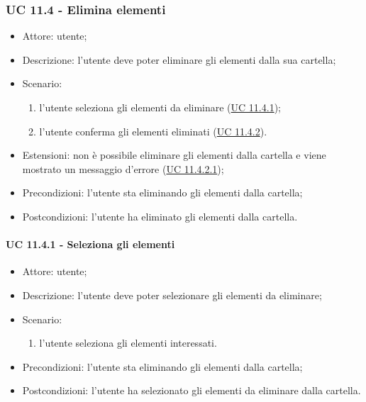     \subsubsection{UC 11.4 - Elimina elementi} \label{sec: UC 11.4}
    \begin{itemize}
        \item Attore: utente;
        \item Descrizione: l'utente deve poter eliminare gli elementi dalla sua cartella;
        \item Scenario:
        \begin{enumerate}
        \item l'utente seleziona gli elementi da eliminare (\hyperref[sec: UC 11.4.1]{UC 11.4.1});
        \item l'utente conferma gli elementi eliminati (\hyperref[sec: UC 11.4.2]{UC 11.4.2}).
        \end{enumerate}
        \item Estensioni: non è possibile eliminare gli elementi dalla cartella e viene mostrato un messaggio d'errore (\hyperref[sec: UC 11.4.2.1]{UC 11.4.2.1});
        \item Precondizioni: l'utente sta eliminando gli elementi dalla cartella;
        \item Postcondizioni: l'utente ha eliminato gli elementi dalla cartella.
    \end{itemize}
    \paragraph{UC 11.4.1 - Seleziona gli elementi} \label{sec: UC 11.4.1}
        \begin{itemize}
            \item Attore: utente;
            \item Descrizione: l'utente deve poter selezionare gli elementi da eliminare;
            \item Scenario:
            \begin{enumerate}
                \item l'utente seleziona gli elementi interessati.
            \end{enumerate}
        \item Precondizioni: l'utente sta eliminando gli elementi dalla cartella;
        \item Postcondizioni: l'utente ha selezionato gli elementi da eliminare dalla cartella.
    \end{itemize}
